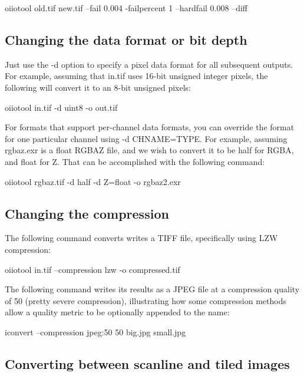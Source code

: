 \begin{code}
    oiiotool old.tif new.tif --fail 0.004 -failpercent 1 --hardfail 0.008 --diff
\end{code}


\subsection*{Changing the data format or bit depth}

Just use the {\cf -d} option to specify a pixel data format for all
subsequent outputs.  For example, assuming that {\cf in.tif} uses 16-bit
unsigned integer pixels, the following will convert it to an 8-bit
unsigned pixels:

\begin{code}
    oiiotool in.tif -d uint8 -o out.tif
\end{code}

For formats that support per-channel data formats, you can override
the format for one particular channel using {\cf -d CHNAME=TYPE}.
For example, assuming {\cf rgbaz.exr} is a {\cf float} RGBAZ file,
and we wish to convert it to be {\cf half} for RGBA, and {\cf float}
for Z.  That can be accomplished with the following command:

\begin{code}
    oiiotool rgbaz.tif -d half -d Z=float -o rgbaz2.exr
\end{code}


\subsection*{Changing the compression}

The following command converts writes a TIFF file, specifically using
LZW compression:

\begin{code}
    oiiotool in.tif --compression lzw -o compressed.tif
\end{code}

The following command writes its results as a JPEG file at a compression
quality of 50 (pretty severe compression), illustrating how some compression
methods allow a quality metric to be optionally appended to the name:

\begin{code}
    iconvert --compression jpeg:50 50 big.jpg small.jpg
\end{code}


\subsection*{Converting between scanline and tiled images}

